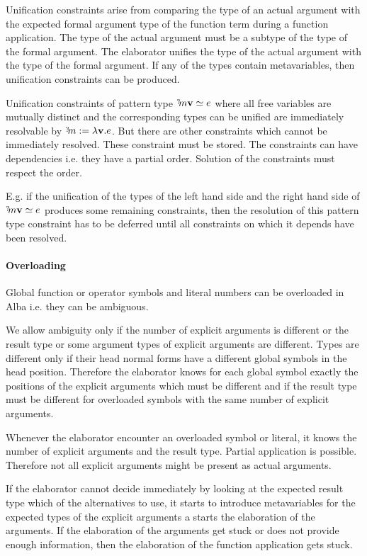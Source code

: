 Unification constraints arise from comparing the type of an actual argument with
the expected formal argument type of the function term during a function
application. The type of the actual argument must be a subtype of the type of
the formal argument. The elaborator unifies the type of the actual argument with
the type of the formal argument. If any of the types contain metavariables, then
unification constraints can be produced.


Unification constraints of pattern type $\meta{m} \vec{v} \unify e$ where all
free variables are mutually distinct and the corresponding types can be unified
are immediately resolvable by $\meta{m} := \lambda \vec{v}. e$. But there are
other constraints which cannot be immediately resolved. These constraint must be
stored. The constraints can have dependencies i.e. they have a partial order.
Solution of the constraints must respect the order.

E.g. if the unification of the types of the left hand side and the right hand
side of $\meta{m} \vec{v} \unify e$ produces some remaining constraints, then
the resolution of this pattern type constraint has to be deferred until all
constraints on which it depends have been resolved.


\paragraph{Overloading} Global function or operator symbols and literal numbers
can be overloaded in Alba i.e. they can be ambiguous.

We allow ambiguity only if the number of explicit arguments is different or the
result type or some argument types of explicit arguments are different. Types
are different only if their head normal forms have a different global symbols in
the head position. Therefore the elaborator knows for each global symbol exactly
the positions of the explicit arguments which must be different and if the
result type must be different for overloaded symbols with the same number of
explicit arguments.

Whenever the elaborator encounter an overloaded symbol or literal, it knows the
number of explicit arguments and the result type. Partial application is
possible. Therefore not all explicit arguments might be present as actual
arguments.

If the elaborator cannot decide immediately by looking at the expected result
type which of the alternatives to use, it starts to introduce metavariables for
the expected types of the explicit arguments a starts the elaboration of the
arguments. If the elaboration of the arguments get stuck or does not provide
enough information, then the elaboration of the function application gets stuck.

